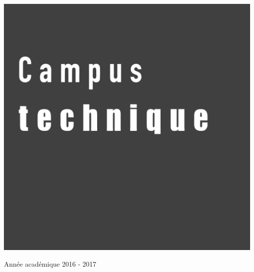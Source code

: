 \begin{center}
  \vspace{1cm}

  \includegraphics[scale=0.08]{textures/logo/technical_bw.pdf}

  \vspace{0.5cm}

  Année académique 2016 - 2017
\end{center}

\thispagestyle{empty}
